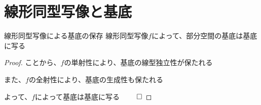 \documentclass[../../../topic_linear-algebra]{subfiles}
\begin{document}
\sectionline
\section{線形同型写像と基底}

\begin{theorem*}{線形同型写像による基底の保存}
  線形同型写像$f$によって、部分空間の基底は基底に写る
\end{theorem*}

\begin{proof}
  ことから、$f$の単射性により、基底の線型独立性が保たれる

  また、$f$の全射性により、基底の生成性も保たれる

  よって、$f$によって基底は基底に写る $\qed$
\end{proof}
\end{document}
